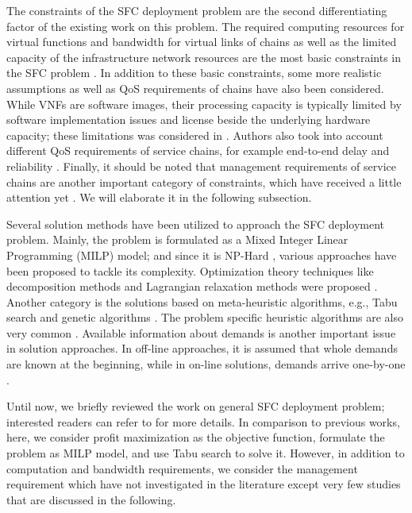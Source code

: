 The constraints of the SFC deployment problem are the second differentiating factor of the existing work on this problem.
The required computing resources for virtual functions and bandwidth for virtual links of chains as well as the limited capacity of the infrastructure network resources are the most basic constraints in the SFC problem \cite{TahmasbiNejad2018,Eramo2016,Huang2019}.
In addition to these basic constraints, some more realistic assumptions as well as QoS requirements of chains have also been considered.
While VNFs are software images, their processing capacity is typically limited by software implementation issues and license beside the underlying hardware capacity;
these limitations was considered in \cite{Luo2020}.
Authors also took into account different QoS requirements of service chains, for example end-to-end delay \cite{Yu2017,Yaghoubpour2019} and reliability \cite{Yu2017,Torkamandi2019,Khezri2019}.
Finally, it should be noted that management requirements of service chains are another important category of constraints, which have received a little attention yet \cite{AbuLebdeh2017,AbuLebdeh20172,Chiang2019}.
We will elaborate it in the following subsection.

Several solution methods have been utilized to approach the SFC deployment problem.
Mainly, the problem is formulated as a Mixed Integer Linear Programming (MILP) model; and since it is NP-Hard \cite{Eramo2016,Ma2017}, various approaches have been proposed to tackle its complexity.
Optimization theory techniques like decomposition methods and Lagrangian relaxation methods were proposed \cite{Liu2017,Farkiani2019,1709.04772}.
Another category is the solutions based on meta-heuristic algorithms, e.g., Tabu search and genetic algorithms \cite{AbuLebdeh2017}.
The problem specific heuristic algorithms are also very common \cite{Ghaznavi2017,Bari2015,Eramo2016}.
Available information about demands is another important issue in solution approaches.
In off-line approaches, it is assumed that whole demands are known at the beginning, while in on-line solutions, demands arrive one-by-one \cite{Alhussein2020}.

Until now, we briefly reviewed the work on general SFC deployment problem; interested readers can refer to \cite{Laghrissi2019} for more details.
In comparison to previous works, here, we consider profit maximization as the objective function, formulate the problem as MILP model, and use Tabu search to solve it.
However, in addition to computation and bandwidth requirements, we consider the management requirement which have not investigated in the literature except very few studies that are discussed in the following. 

